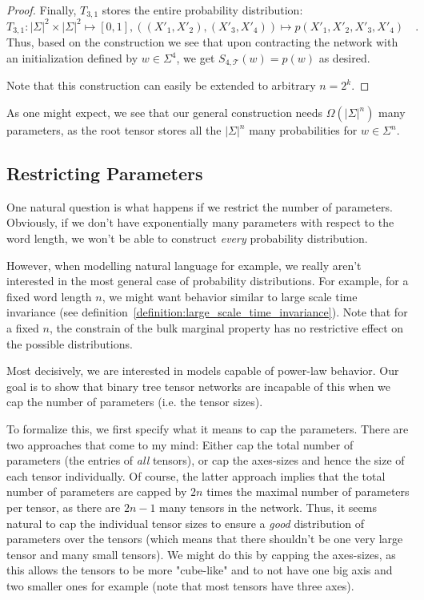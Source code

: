 \documentclass[../../main.tex]{subfiles}
\begin{document}
\begin{proof}
    Finally, $T_{3, 1}$ stores the entire probability distribution:
    \[
        T_{3, 1}: |\Sigma|^2 \times |\Sigma|^2 \mapsto [0, 1], ((X'_1, X'_2), (X'_3, X'_4)) \mapsto p(X'_1, X'_2, X'_3, X'_4) \quad .
    \]
    Thus, based on the construction we see that upon contracting the network with an initialization defined by $w \in \Sigma^4$, we get $S_{4, \mathcal{T}}(w) = p(w)$ as desired.

    Note that this construction can easily be extended to arbitrary $n = 2^k$.
    \end{proof}

    As one might expect, we see that our general construction needs $\Omega(|\Sigma|^n)$ many parameters, as the root tensor stores all the $|\Sigma|^n$ many probabilities for $w \in \Sigma^n$.

\subsection{Restricting Parameters}
    One natural question is what happens if we restrict the number of parameters. Obviously, if we don't have exponentially many parameters with respect to the word length, we won't be able to construct \emph{every} probability distribution.

    However, when modelling natural language for example, we really aren't interested in the most general case of probability distributions. For example, for a fixed word length $n$, we might want behavior similar to large scale time invariance (see definition~\ref{definition:large_scale_time_invariance}). Note that for a fixed $n$, the constrain of the bulk marginal property has no restrictive effect on the possible distributions.

    Most decisively, we are interested in models capable of power-law behavior. Our goal is to show that binary tree tensor networks are incapable of this when we cap the number of parameters (i.e. the tensor sizes).

    To formalize this, we first specify what it means to cap the parameters. There are two approaches that come to my mind: Either cap the total number of parameters (the entries of \emph{all} tensors), or cap the axes-sizes and hence the size of each tensor individually. Of course, the latter approach implies that the total number of parameters are capped by $2n$ times the maximal number of parameters per tensor, as there are $2n-1$ many tensors in the network. Thus, it seems natural to cap the individual tensor sizes to ensure a \emph{good} distribution of parameters over the tensors (which means that there shouldn't be one very large tensor and many small tensors). We might do this by capping the axes-sizes, as this allows the tensors to be more "cube-like" and to not have one big axis and two smaller ones for example (note that most tensors have three axes).
\end{document}
